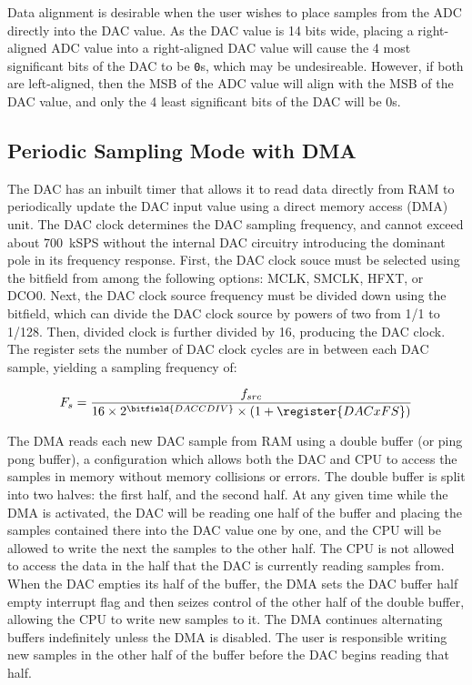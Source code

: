 Data alignment is desirable when the user wishes to place samples from the ADC directly into the DAC value. As the DAC value is 14 bits wide, placing a right-aligned ADC value into a right-aligned DAC value will cause the 4 most significant bits of the DAC to be \texttt{0}s, which may be undesireable. However, if both are left-aligned, then the MSB of the ADC value will align with the MSB of the DAC value, and only the 4 least significant bits of the DAC will be 0s.



\subsection{Periodic Sampling Mode with DMA}

The DAC has an inbuilt timer that allows it to read data directly from RAM to periodically update the DAC input value using a direct memory access (DMA) unit. The DAC clock determines the DAC sampling frequency, and cannot exceed about 700~kSPS without the internal DAC circuitry introducing the dominant pole in its frequency response. First, the DAC clock souce must be selected using the  bitfield from among the following options: MCLK, SMCLK, HFXT, or DCO0. Next, the DAC clock source frequency must be divided down using the  bitfield, which can divide the DAC clock source by powers of two from 1/1 to 1/128. Then, divided clock is further divided by 16, producing the DAC clock. The  register sets the number of DAC clock cycles are in between each DAC sample, yielding a sampling frequency of: 

\begin{equation*}
	F_{s} = \frac{f_{src}}{16 \times 2^\bitfield{DACCDIV} \times (1 + \register{DACxFS})}
\end{equation*}

The DMA reads each new DAC sample from RAM using a double buffer (or ping pong buffer), a configuration which allows both the DAC and CPU to access the samples in memory without memory collisions or errors. The double buffer is split into two halves: the first half, and the second half. At any given time while the DMA is activated, the DAC will be reading one half of the buffer and placing the samples contained there into the DAC value one by one, and the CPU will be allowed to write the next the samples to the other half. The CPU is not allowed to access the data in the half that the DAC is currently reading samples from. When the DAC empties its half of the buffer, the DMA sets the DAC buffer half empty interrupt flag  and then seizes control of the other half of the double buffer, allowing the CPU to write new samples to it. The DMA continues alternating buffers indefinitely unless the DMA is disabled. The user is responsible writing new samples in the other half of the buffer before the DAC begins reading that half.


